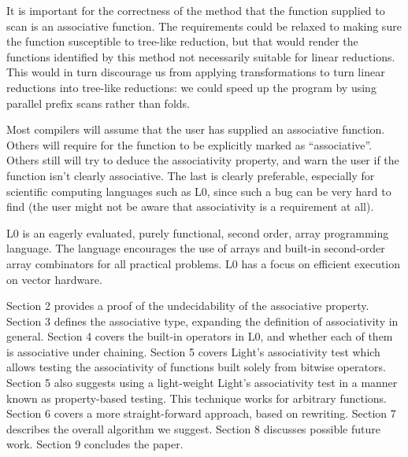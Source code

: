 It is important for the correctness of the method that the function supplied to
scan is an associative function. The requirements could be relaxed to making
sure the function susceptible to tree-like reduction, but that would render the
functions identified by this method not necessarily suitable for linear
reductions. This would in turn discourage us from applying transformations to
turn linear reductions into tree-like reductions: we could speed up the program
by using parallel prefix scans rather than folds.

Most compilers will assume that the user has supplied an associative function.
Others will require for the function to be explicitly marked as
``associative''. Others still will try to deduce the associativity property,
and warn the user if the function isn't clearly associative. The last is
clearly preferable, especially for scientific computing languages such as L0,
since such a bug can be very hard to find (the user might not be aware that
associativity is a requirement at all).

L0 is an eagerly evaluated, purely functional, second order, array programming
language. The language encourages the use of arrays and built-in second-order
array combinators for all practical problems. L0 has a focus on efficient
execution on vector hardware.

Section 2 provides a proof of the undecidability of the associative property.
Section 3 defines the associative type, expanding the definition of
associativity in general. Section 4 covers the built-in operators in L0, and
whether each of them is associative under chaining. Section 5 covers Light's
associativity test which allows testing the associativity of functions built
solely from bitwise operators. Section 5 also suggests using a light-weight
Light's associativity test in a manner known as property-based testing. This
technique works for arbitrary functions. Section 6 covers a more
straight-forward approach, based on rewriting. Section 7 describes the overall
algorithm we suggest. Section 8 discusses possible future work. Section 9
concludes the paper.

